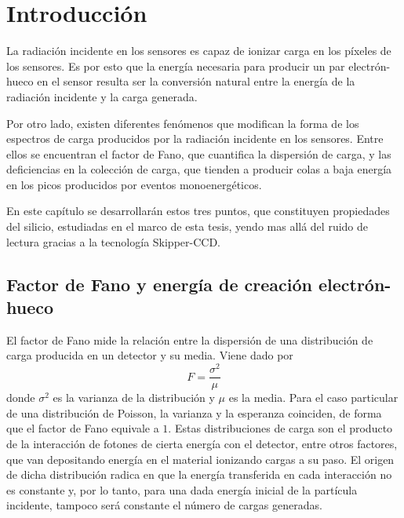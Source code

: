 \newpage
{}  %
\setcounter{page}{1}    %

\chapter{Introducción}
\noindent La radiación incidente en los sensores es capaz de ionizar carga en los píxeles de los sensores. Es por esto que la energía necesaria para producir un par electrón-hueco en el sensor resulta ser la conversión natural entre la energía de la radiación incidente y la carga generada. 

Por otro lado, existen diferentes fenómenos que modifican la forma de los espectros de carga producidos por la radiación incidente en los sensores. Entre ellos se encuentran el factor de Fano, que cuantifica la dispersión de carga, y las deficiencias en la colección de carga, que tienden a producir colas a baja energía en los picos producidos por eventos monoenergéticos.

En este capítulo se desarrollarán estos tres puntos, que constituyen propiedades del silicio, estudiadas en el marco de esta tesis, yendo mas allá del ruido de lectura gracias a la tecnología Skipper-CCD.

\section{Factor de Fano y energía de creación electrón-hueco}
\noindent El factor de Fano mide la relación entre la dispersión de una distribución de carga producida en un detector y su media. Viene dado por
\begin{equation*}
    F = \frac{\sigma^{2}}{\mu}
\end{equation*}
donde $\sigma^{2}$ es la varianza de la distribución y $\mu$ es la media. Para el caso particular de una distribución de Poisson, la varianza y la esperanza coinciden, de forma que el factor de Fano equivale a $1$. Estas distribuciones de carga son el producto de la interacción de fotones de cierta energía con el detector, entre otros factores, que van depositando energía en el material ionizando cargas a su paso. El origen de dicha distribución radica en que la energía transferida en cada interacción no es constante y, por lo tanto, para una dada energía inicial de la partícula incidente, tampoco será constante el número de cargas generadas.

